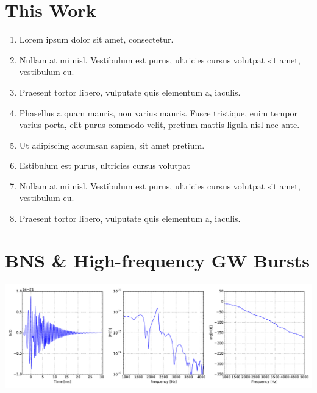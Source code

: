 \documentclass[a0,landscape]{a0poster}
\begin{document}
\begin{multicols}{4}

\color{DarkSlateGray} %

\section*{This Work}

\begin{enumerate}
\item Lorem ipsum dolor sit amet, consectetur.
\item Nullam at mi nisl. Vestibulum est purus, ultricies cursus volutpat sit amet, vestibulum eu.
\item Praesent tortor libero, vulputate quis elementum a, iaculis.
\item Phasellus a quam mauris, non varius mauris. Fusce tristique, enim tempor varius porta, elit purus commodo velit, pretium mattis ligula nisl nec ante.
\item Ut adipiscing accumsan sapien, sit amet pretium.
\item Estibulum est purus, ultricies cursus volutpat
\item Nullam at mi nisl. Vestibulum est purus, ultricies cursus volutpat sit amet, vestibulum eu.
\item Praesent tortor libero, vulputate quis elementum a, iaculis.
\end{enumerate}


\section*{BNS \& High-frequency GW Bursts}

\begin{minipage}{\columnwidth}
    \centering
    \includegraphics[width=\linewidth]{example_waveform.pdf}%
\end{minipage}



\end{multicols}
\end{document}
